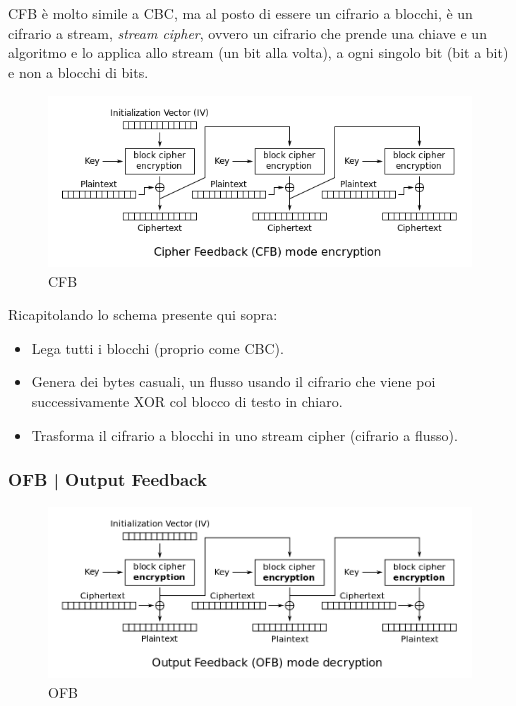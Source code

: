 \textsf{\small CFB è molto simile a CBC, ma al posto di essere un cifrario a blocchi, è un cifrario a stream, \emph{stream cipher}, ovvero un cifrario che prende una chiave e un algoritmo e lo applica allo stream (un bit alla volta), a ogni singolo bit (bit a bit) e non a blocchi di bits.}

\begin{figure}[H]
	\centering
	\includegraphics[width=1\textwidth, height=1\textheight, keepaspectratio]{./images/aes_modes/cfb.png}
	\caption{CFB}
	\label{fig:cfb}
\end{figure}

\textsf{\small Ricapitolando lo schema presente qui sopra:}

\begin{itemize}
	\item \textsf{\small Lega tutti i blocchi (proprio come CBC).}
	\item \textsf{\small Genera dei bytes casuali, un flusso usando il cifrario che viene poi successivamente XOR col blocco di testo in chiaro.}
	\item \textsf{\small Trasforma il cifrario a blocchi in uno stream cipher (cifrario a flusso).}
\end{itemize}


\subsubsection{OFB | Output Feedback}

\begin{figure}[H]
	\centering
	\includegraphics[width=1\textwidth, height=1\textheight, keepaspectratio]{./images/aes_modes/ofb.png} %
	\caption{OFB}
	\label{fig:ofb}
\end{figure}

